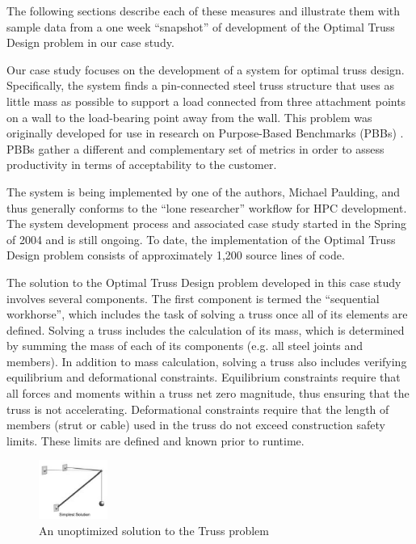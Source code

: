 \documentclass[10pt,twocolumn]{article}
\begin{document}
The following sections describe each of these measures and illustrate them
with sample data from a one week ``snapshot'' of development of the Optimal
Truss Design problem in our case study. 

\label{sec:truss}

Our case study focuses on the development of a system for optimal truss
design.  Specifically, the system finds a pin-connected steel truss
structure that uses as little mass as possible to support a load connected
from three attachment points on a wall to the load-bearing point away from
the wall.  This problem was originally developed for use in research on
Purpose-Based Benchmarks (PBBs) \cite{Gustafson04}.  PBBs gather a
different and complementary set of metrics in order to assess productivity
in terms of acceptability to the customer.  

The system is being implemented by one of the authors, Michael Paulding, and
thus generally conforms to the ``lone researcher'' workflow for HPC development.  The
system development process and associated case study started in the Spring
of 2004 and is still ongoing.  To date, the implementation of the Optimal
Truss Design problem consists of approximately 1,200 source lines of code.

The solution to the Optimal Truss Design problem developed in this case
study involves several components. The first component is termed the
``sequential workhorse'', which includes the task of solving a truss once
all of its elements are defined.  Solving a truss includes the calculation
of its mass, which is determined by summing the mass of each of its
components (e.g. all steel joints and members).  In addition to mass
calculation, solving a truss also includes verifying equilibrium and
deformational constraints.  Equilibrium constraints require that all forces
and moments within a truss net zero magnitude, thus ensuring that the truss
is not accelerating.  Deformational constraints require that the length of
members (strut or cable) used in the truss do not exceed construction
safety limits.  These limits are defined and known prior to runtime.

\begin{figure}[htpb]
  \centering
  \includegraphics[width=0.2\textwidth]{simple.truss.eps}
  \caption{An unoptimized solution to the Truss problem}
  \label{fig:simple_truss}
\end{figure}
\end{document}
